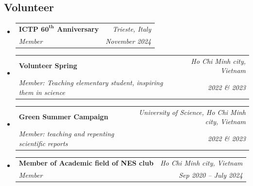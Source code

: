 \documentclass[letterpaper,11pt]{article}
\makeatletter
\newcommand{\resumeOrganizationHeading}[4]{
	\vspace{-2pt}\item
	\begin{tabular*}{0.97\textwidth}[t]{l@{\extracolsep{\fill}}r}
		\textbf{#1} & \textit{\small #2} \\
		\textit{\small#3} & \textit{\small #4} 
	\end{tabular*}\vspace{-7pt}
}
\newcommand{\resumeSubHeadingListStart}{\begin{itemize}[leftmargin=0.15in, label={}]}
\newcommand{\resumeSubHeadingListEnd}{\end{itemize}}
\makeatother
\begin{document}
\subsection*{Volunteer}
\resumeSubHeadingListStart
\resumeOrganizationHeading{ICTP \(\textbf{60}^{\textbf{th}}\) Anniversary}{Trieste, Italy}{Member}{November 2024}
\resumeOrganizationHeading{Volunteer Spring}{Ho Chi Minh city, Vietnam}{Member: Teaching elementary student, inspiring them in science}{2022 \& 2023}
\resumeOrganizationHeading{Green Summer Campaign}{University of Science, Ho Chi Minh city, Vietnam}{Member: teaching and repenting scientific reports}{2022 \& 2023}
\resumeOrganizationHeading
{Member of Academic field of NES club}{Ho Chi Minh city, Vietnam}{Member}{Sep 2020 -- July 2024}
\resumeSubHeadingListEnd
	
	
	
	
	
	
	
	
	
\end{document}
